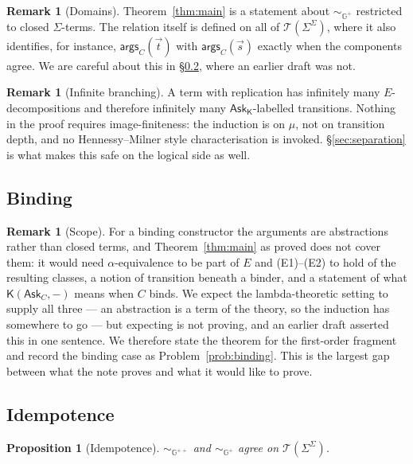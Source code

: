 \documentclass[11pt]{article}
\theoremstyle{plain}
\newtheorem{proposition}[theorem]{Proposition}
\theoremstyle{definition}
\newtheorem{remark}[theorem]{Remark}
\newcommand{\Kc}{\mathsf{K}}
\newcommand{\Gg}{\mathbb{G}}
\newcommand{\Ask}{\mathsf{Ask}}
\newcommand{\args}{\mathsf{args}}
\newcommand{\bis}{\sim}
\newcommand{\Terms}{\mathcal{T}}
\begin{document}
\begin{remark}[Domains]
Theorem~\ref{thm:main} is a statement about $\bis_{\Gg^+}$ restricted to closed $\Sigma$-terms. The
relation itself is defined on all of $\Terms(\Sigma^{\Sigma})$, where it also identifies, for instance,
$\args_C(\vec t)$ with $\args_C(\vec s)$ exactly when the components agree. We are careful about this
in \S\ref{sec:idem}, where an earlier draft was not.
\end{remark}

\begin{remark}[Infinite branching]
A term with replication has infinitely many $E$-decompositions and therefore infinitely many
$\Ask_\Kc$-labelled transitions. Nothing in the proof requires image-finiteness: the induction is on
$\mu$, not on transition depth, and no Hennessy--Milner style characterisation is invoked.
\S\ref{sec:separation} is what makes this safe on the logical side as well.
\end{remark}

\subsection{Binding}

\begin{remark}[Scope]
\label{rem:binding}
For a binding constructor the arguments are abstractions rather than closed terms, and
Theorem~\ref{thm:main} as proved does not cover them: it would need $\alpha$-equivalence to be part of
$E$ and (E1)--(E2) to hold of the resulting classes, a notion of transition beneath a binder, and a
statement of what $\Kc(\Ask_C,-)$ means when $C$ binds. We expect the lambda-theoretic setting to
supply all three --- an abstraction is a term of the theory, so the induction has somewhere to go ---
but expecting is not proving, and an earlier draft asserted this in one sentence. We therefore state
the theorem for the first-order fragment and record the binding case as
Problem~\ref{prob:binding}. This is the largest gap between what the note proves and what it would like
to prove.
\end{remark}

\subsection{Idempotence}
\label{sec:idem}

\begin{proposition}[Idempotence]
\label{prop:idem}
$\bis_{\Gg^{++}}$ and $\bis_{\Gg^+}$ agree on $\Terms(\Sigma^\Sigma)$.
\end{proposition}
\end{document}

